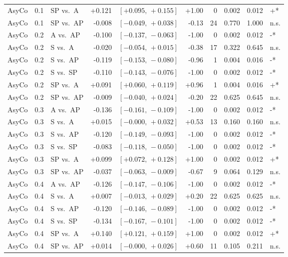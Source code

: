 \begin{landscape}
\begin{scriptsize}
\begin{longtable}{lllrrrrrrl}
AsyCo & 0.1 & SP vs.\ A & +0.121 & $[+0.095,\,+0.155]$ & +1.00 & 0 & 0.002 & 0.012 & +* \\
AsyCo & 0.1 & SP vs.\ AP & -0.008 & $[-0.049,\,+0.038]$ & -0.13 & 24 & 0.770 & 1.000 & n.s. \\
AsyCo & 0.2 & A vs.\ AP & -0.100 & $[-0.137,\,-0.063]$ & -1.00 & 0 & 0.002 & 0.012 & -* \\
AsyCo & 0.2 & S vs.\ A & -0.020 & $[-0.054,\,+0.015]$ & -0.38 & 17 & 0.322 & 0.645 & n.s. \\
AsyCo & 0.2 & S vs.\ AP & -0.119 & $[-0.153,\,-0.080]$ & -0.96 & 1 & 0.004 & 0.016 & -* \\
AsyCo & 0.2 & S vs.\ SP & -0.110 & $[-0.143,\,-0.076]$ & -1.00 & 0 & 0.002 & 0.012 & -* \\
AsyCo & 0.2 & SP vs.\ A & +0.091 & $[+0.060,\,+0.119]$ & +0.96 & 1 & 0.004 & 0.016 & +* \\
AsyCo & 0.2 & SP vs.\ AP & -0.009 & $[-0.040,\,+0.024]$ & -0.20 & 22 & 0.625 & 0.645 & n.s. \\
AsyCo & 0.3 & A vs.\ AP & -0.136 & $[-0.161,\,-0.109]$ & -1.00 & 0 & 0.002 & 0.012 & -* \\
AsyCo & 0.3 & S vs.\ A & +0.015 & $[-0.000,\,+0.032]$ & +0.53 & 13 & 0.160 & 0.160 & n.s. \\
AsyCo & 0.3 & S vs.\ AP & -0.120 & $[-0.149,\,-0.093]$ & -1.00 & 0 & 0.002 & 0.012 & -* \\
AsyCo & 0.3 & S vs.\ SP & -0.083 & $[-0.118,\,-0.050]$ & -1.00 & 0 & 0.002 & 0.012 & -* \\
AsyCo & 0.3 & SP vs.\ A & +0.099 & $[+0.072,\,+0.128]$ & +1.00 & 0 & 0.002 & 0.012 & +* \\
AsyCo & 0.3 & SP vs.\ AP & -0.037 & $[-0.063,\,-0.009]$ & -0.67 & 9 & 0.064 & 0.129 & n.s. \\
AsyCo & 0.4 & A vs.\ AP & -0.126 & $[-0.147,\,-0.106]$ & -1.00 & 0 & 0.002 & 0.012 & -* \\
AsyCo & 0.4 & S vs.\ A & +0.007 & $[-0.013,\,+0.029]$ & +0.20 & 22 & 0.625 & 0.625 & n.s. \\
AsyCo & 0.4 & S vs.\ AP & -0.120 & $[-0.146,\,-0.089]$ & -1.00 & 0 & 0.002 & 0.012 & -* \\
AsyCo & 0.4 & S vs.\ SP & -0.134 & $[-0.167,\,-0.101]$ & -1.00 & 0 & 0.002 & 0.012 & -* \\
AsyCo & 0.4 & SP vs.\ A & +0.140 & $[+0.121,\,+0.159]$ & +1.00 & 0 & 0.002 & 0.012 & +* \\
AsyCo & 0.4 & SP vs.\ AP & +0.014 & $[-0.000,\,+0.026]$ & +0.60 & 11 & 0.105 & 0.211 & n.s. \\

\end{longtable}
\end{scriptsize}
\end{landscape}
